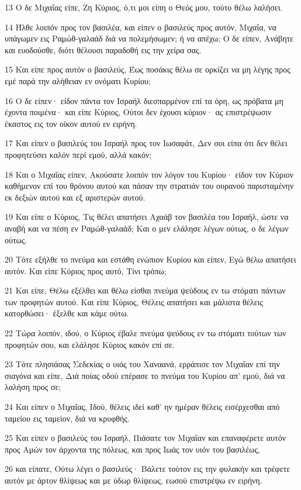 \par 13 Ο δε Μιχαΐας είπε, Ζη Κύριος, ό,τι μοι είπη ο Θεός μου, τούτο θέλω λαλήσει.
\par 14 Ήλθε λοιπόν προς τον βασιλέα, και είπεν ο βασιλεύς προς αυτόν, Μιχαΐα, να υπάγωμεν εις Ραμώθ-γαλαάδ διά να πολεμήσωμεν; ή να απέχω; Ο δε είπεν, Ανάβητε και ευοδούσθε, διότι θέλουσι παραδοθή εις την χείρα σας.
\par 15 Και είπε προς αυτόν ο βασιλεύς, Έως ποσάκις θέλω σε ορκίζει να μη λέγης προς εμέ παρά την αλήθειαν εν ονόματι Κυρίου;
\par 16 Ο δε είπεν· είδον πάντα τον Ισραήλ διεσπαρμένον επί τα όρη, ως πρόβατα μη έχοντα ποιμένα· και είπε Κύριος, Ούτοι δεν έχουσι κύριον· ας επιστρέψωσιν έκαστος εις τον οίκον αυτού εν ειρήνη.
\par 17 Και είπεν ο βασιλεύς του Ισραήλ προς τον Ιωσαφάτ, Δεν σοι είπα ότι δεν θέλει προφητεύσει καλόν περί εμού, αλλά κακόν;
\par 18 Και ο Μιχαΐας είπεν, Ακούσατε λοιπόν τον λόγον του Κυρίου· είδον τον Κύριον καθήμενον επί του θρόνου αυτού και πάσαν την στρατιάν του ουρανού παρισταμένην εκ δεξιών αυτού και εξ αριστερών αυτού.
\par 19 Και είπε ο Κύριος, Τις θέλει απατήσει Αχαάβ τον βασιλέα του Ισραήλ, ώστε να αναβή και να πέση εν Ραμώθ-γαλαάδ; Και ο μεν ελάλησε λέγων ούτως, ο δε λέγων ούτως.
\par 20 Τότε εξήλθε το πνεύμα και εστάθη ενώπιον Κυρίου και είπεν, Εγώ θέλω απατήσει αυτόν. Και είπε Κύριος προς αυτό, Τίνι τρόπω;
\par 21 Και είπε, Θέλω εξέλθει και θέλω είσθαι πνεύμα ψεύδους εν τω στόματι πάντων των προφητών αυτού. Και είπε Κύριος, Θέλεις απατήσει και μάλιστα θέλεις κατορθώσει· έξελθε και κάμε ούτω.
\par 22 Τώρα λοιπόν, ιδού, ο Κύριος έβαλε πνεύμα ψεύδους εν τω στόματι τούτων των προφητών σου, και ελάλησε Κύριος κακόν επί σε.
\par 23 Τότε πλησιάσας Σεδεκίας ο υιός του Χαναανά, ερράπισε τον Μιχαΐαν επί την σιαγόνα και είπε, Διά ποίας οδού επέρασε το πνεύμα του Κυρίου απ' εμού, διά να λαλήση προς σε;
\par 24 Και είπεν ο Μιχαΐας, Ιδού, θέλεις ιδεί καθ' ην ημέραν θέλεις εισέρχεσθαι από ταμείου εις ταμείον, διά να κρυφθής.
\par 25 Και είπεν ο βασιλεύς του Ισραήλ, Πιάσατε τον Μιχαΐαν και επαναφέρετε αυτόν προς Αμών τον άρχοντα της πόλεως, και προς Ιωάς τον υιόν του βασιλέως,
\par 26 και είπατε, Ούτω λέγει ο βασιλεύς· Βάλετε τούτον εις την φυλακήν και τρέφετε αυτόν με άρτον θλίψεως και με ύδωρ θλίψεως, εωσού επιστρέψω εν ειρήνη.
